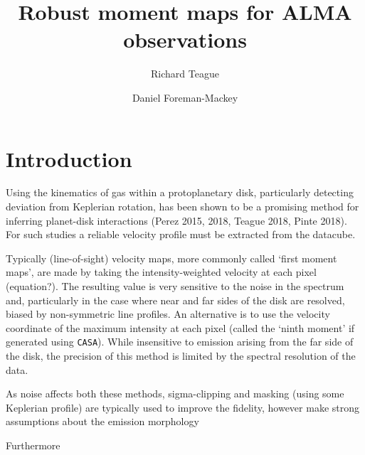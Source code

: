 \documentclass[rnaas]{aastex62}
\begin{document}
\raggedbottom\sloppy\sloppypar\frenchspacing

\title{%
Robust moment maps for ALMA observations
}

\author[0000-0003-1534-5186]{Richard Teague}

\author[0000-0002-9328-5652]{Daniel Foreman-Mackey}


\section{Introduction}


Using the kinematics of gas within a protoplanetary disk, particularly detecting deviation from Keplerian rotation, has been shown to be a promising method for inferring planet-disk interactions (Perez 2015, 2018, Teague 2018, Pinte 2018). For such studies a reliable velocity profile must be extracted from the datacube.

Typically (line-of-sight) velocity maps, more commonly called `first moment maps', are made by taking the intensity-weighted velocity at each pixel (equation?). The resulting value is very sensitive to the noise in the spectrum and, particularly in the case where near and far sides of the disk are resolved, biased by non-symmetric line profiles. An alternative is to use the velocity coordinate of the maximum intensity at each pixel (called the `ninth moment' if generated using \texttt{CASA}). While insensitive to emission arising from the far side of the disk, the precision of this method is limited by the spectral resolution of the data. 

As noise affects both these methods, sigma-clipping and masking (using some Keplerian profile) are typically used to improve the fidelity, however make strong assumptions about the emission morphology

Furthermore
\end{document}

